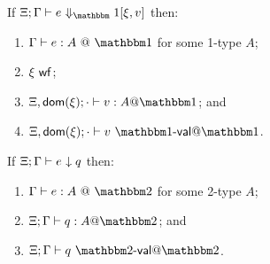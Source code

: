 \begin{theorem}
If $\diaonesub$ then:
\begin{enumerate}
\item $\typesone e A$ for some 1-type $A$;
\item $\xi\ \mathsf{wf}$;
\item $\Xi,\dom\xi;\cdot\vdash v : A @ \bbone$; and
\item $\Xi,\dom\xi;\cdot\vdash v\valoo$.
\end{enumerate}
\end{theorem}

\begin{theorem}
If ${\Xi;\Gamma} \vdash {e_{}} \downarrow {q_{}}$ then:
\begin{enumerate}
\item $\typestwo e A$ for some 2-type $A$;
\item $\Xi;\Gamma\vdash q : A @ \bbtwo$; and
\item $\Xi;\Gamma\vdash q\valtt$.
\end{enumerate}
\end{theorem}



